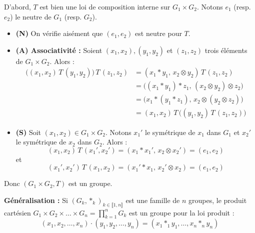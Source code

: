 \documentclass[a4paper,11pt]{article}
\newcommand{\intEnt}[2]{\llbracket #1, #2 \rrbracket}
\begin{document}
\begin{demonstration}
D'abord, $T$ est bien une loi de composition interne sur $G_1 \times G_2$. Notons $e_1$ (resp. $e_2$) le neutre de $G_1$ (resp. $G_2$).
\begin{itemize}
    \item \textbf{(N)} On vérifie aisément que $(e_1, e_2)$ est neutre pour $T$.
    \item \textbf{(A) Associativité :} Soient $(x_1, x_2), (y_1, y_2)$ et $(z_1, z_2)$ trois éléments de $G_1 \times G_2$. Alors :
    \begin{align*}
        \big((x_1, x_2) \, T \, (y_1, y_2)\big) \, T \, (z_1, z_2) 
        &= (x_1 * y_1, \, x_2 \otimes y_2) \, T \, (z_1, z_2) \\
        &= \big((x_1 * y_1) * z_1, \, (x_2 \otimes y_2) \otimes z_2\big) \\
        &= \big(x_1 * (y_1 * z_1), \, x_2 \otimes (y_2 \otimes z_2)\big) \\
        &= (x_1, x_2) \, T \, \big((y_1, y_2) \, T \, (z_1, z_2)\big)
    \end{align*}
    \item \textbf{(S)} Soit $(x_1, x_2) \in G_1 \times G_2$. Notons $x_1'$ le symétrique de $x_1$ dans $G_1$ et $x_2'$ le symétrique de $x_2$ dans $G_2$. Alors :
    \[
    (x_1, x_2) \, T \, (x_1', x_2') = (x_1 * x_1', \, x_2 \otimes x_2') = (e_1, e_2)
    \]
    et
    \[
    (x_1', x_2') \, T \, (x_1, x_2) = (x_1' * x_1, \, x_2' \otimes x_2) = (e_1, e_2)
    \]
\end{itemize}
Donc $(G_1 \times G_2, T)$ est un groupe.
\end{demonstration}

\textbf{Généralisation :} Si $(G_k, *_k)_{k \in \intEnt{1}{n}}$ est une famille de $n$ groupes, le produit cartésien $G_1 \times G_2 \times \dots \times G_n = \displaystyle\prod_{k=1}^n G_k$ est un groupe pour la loi produit :
\[
(x_1, x_2, \dots, x_n) \cdot (y_1, y_2, \dots, y_n) = (x_1 *_1 y_1, \dots, x_n *_n y_n)
\]
\end{document}
